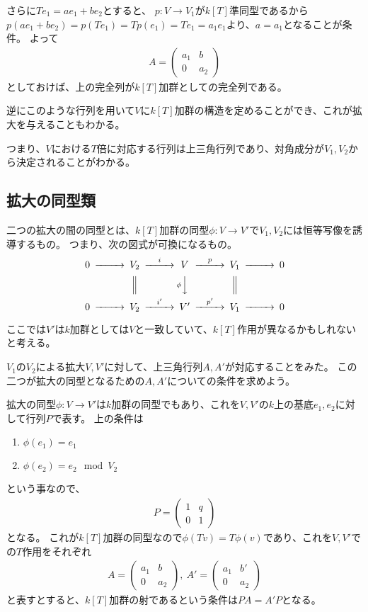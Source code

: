 \documentclass{jsarticle}
\begin{document}
さらに$Te_1=ae_1+be_2$とすると、
$p:V \to V_1$が$k[T]$準同型であるから$p(ae_1+be_2)=p(Te_1)=Tp(e_1)=Te_1=a_1e_1$より、$a=a_1$となることが条件。
よって
\begin{align*}
A=\begin{pmatrix}a_1&b\\0&a_2\end{pmatrix}
\end{align*}
としておけば、上の完全列が$k[T]$加群としての完全列である。

逆にこのような行列を用いて$V$に$k[T]$加群の構造を定めることができ、これが拡大を与えることもわかる。

つまり、$V$における$T$倍に対応する行列は上三角行列であり、対角成分が$V_1, V_2$から決定されることがわかる。

\subsection{拡大の同型類}
\begin{dfn}
二つの拡大の間の同型とは、$k[T]$加群の同型$\phi:V \to V'$で$V_1, V_2$には恒等写像を誘導するもの。
つまり、次の図式が可換になるもの。
\[
\begin{CD}
0 @>>> V_2 @>i>> V @>p>> V_1 @>>> 0\\
@.    @|    @V\phi VV     @|    \\
0 @>>> V_2 @>i'>> V' @>p'>> V_1 @>>> 0\\
\end{CD}
\]
\end{dfn}

ここでは$V'$は$k$加群としては$V$と一致していて、$k[T]$作用が異なるかもしれないと考える。

\begin{prob}
$V_1$の$V_2$による拡大$V, V'$に対して、上三角行列$A, A'$が対応することをみた。
この二つが拡大の同型となるための$A, A'$についての条件を求めよう。
\end{prob}
拡大の同型$\phi:V \to V'$は$k$加群の同型でもあり、これを$V, V'$の$k$上の基底$e_1, e_2$に対して行列$P$で表す。
上の条件は
\begin{enumerate}
\item $\phi(e_1)=e_1$
\item $\phi(e_2)=e_2 \mod V_2$
\end{enumerate}
という事なので、
\begin{align*}
P=\begin{pmatrix}1&q\\0&1\end{pmatrix}
\end{align*}
となる。
これが$k[T]$加群の同型なので$\phi(Tv)=T\phi(v)$であり、これを$V, V'$での$T$作用をそれぞれ
\begin{align*}
A=\begin{pmatrix}a_1&b\\0&a_2\end{pmatrix},~
A'=\begin{pmatrix}a_1&b'\\0&a_2\end{pmatrix}
\end{align*}
と表すとすると、$k[T]$加群の射であるという条件は$PA=A'P$となる。
\end{document}
